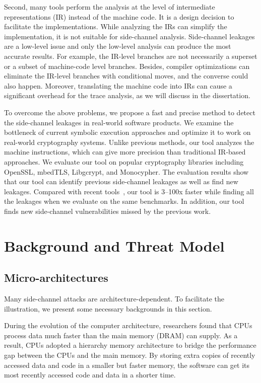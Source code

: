 Second, many tools perform the analysis at the level of intermediate representations (IR) instead of the machine code. It is a design decision to facilitate the implementations. While analyzing the IRs can simplify the implementation, it is not suitable for side-channel analysis.  Side-channel leakages are a low-level issue and only the low-level analysis can produce the most accurate results. For example, the IR-level branches are not necessarily a superset or a subset of machine-code level branches. Besides, compiler optimizations can eliminate the IR-level branches with conditional moves, and the converse could also happen. Moreover, translating the machine code into IRs can cause a significant overhead for the trace analysis, as we will discuss in the dissertation.

To overcome the above problems, we propose a fast and precise method to detect the side-channel leakages in real-world software products. We examine the bottleneck of current symbolic execution approaches and optimize it to work on real-world cryptography systems. Unlike previous methods, our tool analyzes the machine instructions, which can give more precision than traditional IR-based approaches. We evaluate our tool on popular cryptography libraries including OpenSSL, mbedTLS, Libgcrypt, and Monocypher. The evaluation results show that our tool can identify previous side-channel leakages as well as find new leakages. Compared with recent tools~\cite{203878,217537,Wichelmann:2018:MFF:3274694.3274741}, our tool is 3--100x faster while finding all the leakages when we evaluate on the same benchmarks. In addition, our tool finds new side-channel vulnerabilities missed by the previous work. 

\section{Background and Threat Model}
\subsection{Micro-architectures}
Many side-channel attacks are architecture-dependent. To facilitate the illustration, we present some necessary backgrounds in this section.

During the evolution of the computer architecture, researchers found that CPUs process data much faster than the main memory (DRAM) can supply. As a result, CPUs adopted a hierarchy memory architecture to bridge the performance gap between the CPUs and the main memory. By storing extra copies of recently accessed data and code in a smaller but faster memory, the software can get its most recently accessed code and data in a shorter time.

